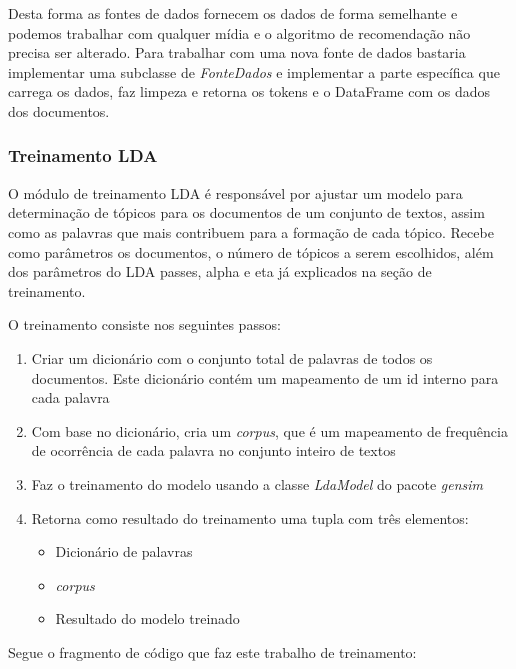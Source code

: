Desta forma as fontes de dados fornecem os dados de forma semelhante e podemos trabalhar com qualquer mídia e o algoritmo de recomendação não precisa ser alterado.
Para trabalhar com uma nova fonte de dados bastaria implementar uma subclasse de \textit{FonteDados} e implementar a parte específica que carrega os dados, faz limpeza e retorna os tokens e o DataFrame com os dados dos documentos.

\subsubsection{Treinamento LDA}

O módulo de treinamento LDA é responsável por ajustar um modelo para determinação de tópicos para os documentos de um conjunto de textos, assim como as 
palavras que mais contribuem para a formação de cada tópico. Recebe como parâmetros os documentos, o número de tópicos a serem escolhidos, 
além dos parâmetros do LDA passes, alpha e eta já explicados na seção de treinamento.

O treinamento consiste nos seguintes passos:

\begin{enumerate}
    \item Criar um dicionário com o conjunto total de palavras de todos os documentos. Este dicionário contém um mapeamento de um id interno para cada palavra
    \item Com base no dicionário, cria um \textit{corpus}, que é um mapeamento de frequência de ocorrência de cada palavra no conjunto inteiro de textos
    \item Faz o treinamento do modelo usando a classe \textit{LdaModel} do pacote \textit{gensim}
    \item Retorna como resultado do treinamento uma tupla com três elementos:
    \begin{itemize}
        \item Dicionário de palavras
        \item \textit{corpus}
        \item Resultado do modelo treinado
    \end{itemize}
\end{enumerate}

Segue o fragmento de código que faz este trabalho de treinamento:
\vspace{3mm} %

